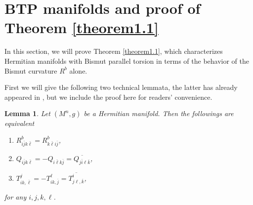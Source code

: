 \documentclass{amsart}
\numberwithin{equation}{section}
\newtheorem{lemma}  [theorem]     {Lemma}
\theoremstyle{definition}
\renewcommand{\1}{\mathds{1}}
\renewcommand{\>}{\rightarrow}
\begin{document}
\vspace{0.4cm}

\section{BTP manifolds and proof of Theorem \ref{theorem1.1}}\label{BTP}

In this section, we will prove Theorem \ref{theorem1.1}, which characterizes Hermitian manifolds with Bismut parallel torsion in terms of the behavior of the Bismut curvature $R^b$ alone.

First we will give the following two technical lemmata, the latter has already appeared in \cite[\S 4]{ZhaoZ19Str}, but we include the proof here for readers' convenience.

\begin{lemma}\label{swap}
Let $(M^n,g)$ be a Hermitian manifold. Then the followings are equivalent
\begin{enumerate}
\item $R^b_{i \bar{j} k \bar{\ell}} = R^b_{k \bar{\ell} i \bar{j}}$,
\item $Q_{i \bar{j} k \bar{\ell}}=-Q_{i\bar{\ell} k \bar{j}}= \overline{Q_{j\bar{i}\ell \bar{k}}}$,
\item $T^j_{ik ,\overline{\ell }} = - T^{\ell}_{ik ,\overline{j } } = \overline{  T^i_{j\ell  ,\overline{k }} }$,
\end{enumerate}
for any $i,j,k,\ell$.
\end{lemma}
\end{document}

